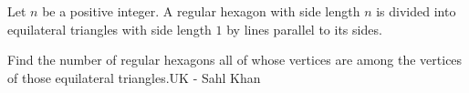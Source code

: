 Let $n$ be a positive integer. A regular hexagon with side length $n$ is divided into equilateral triangles with side length $1$ by lines parallel to its sides.

Find the number of regular hexagons all of whose vertices are among the vertices of those equilateral triangles.UK - Sahl Khan